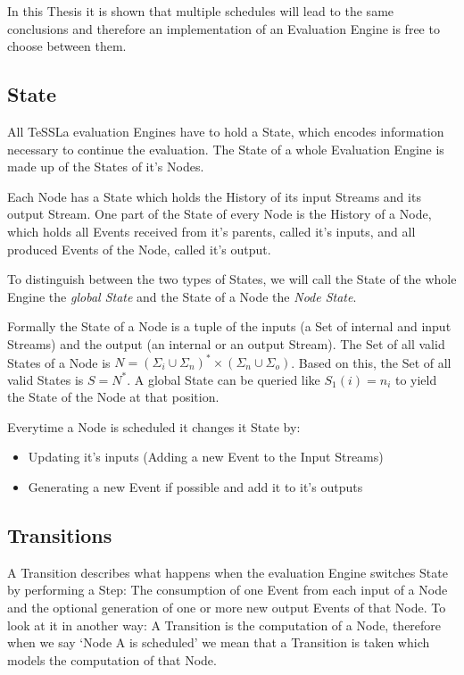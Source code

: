 In this Thesis it is shown that multiple schedules will lead to the same conclusions and therefore an implementation of an Evaluation Engine is free to choose between them.

\subsection{State}
\label{sec:concepts:def:state}

All TeSSLa evaluation Engines have to hold a State, which encodes information necessary to continue the evaluation.
The State of a whole Evaluation Engine is made up of the States of it's Nodes.

Each Node has a State which holds the History of its input Streams and its output Stream.
One part of the State of every Node is the History of a Node, which holds all Events received from it's parents, called it's inputs, and all produced Events of the Node, called it's output.

To distinguish between the two types of States, we will call the State of the whole Engine the \emph{global State} and the State of a Node the \emph{Node State}.

Formally the State of a Node is a tuple of the inputs (a Set of internal and input Streams) and the output (an internal or an output Stream).
The Set of all valid States of a Node is \(N = {(\Sigma_i \cup \Sigma_n)}^*\times(\Sigma_n \cup \Sigma_o)\).
Based on this, the Set of all valid States is \(S = N^*\).
A global State can be queried like \(S_1(i) = n_i\) to yield the State of the Node at that position.

Everytime a Node is scheduled it changes it State by:

\begin{itemize}
  \item Updating it's inputs (Adding a new Event to the Input Streams)
  \item Generating a new Event if possible and add it to it's outputs
\end{itemize}

\subsection{Transitions}
\label{sec:concepts:def:transitions}

A Transition describes what happens when the evaluation Engine switches State by performing a Step:
The consumption of one Event from each input of a Node and the optional generation of one or more new output Events of that Node.
To look at it in another way: A Transition is the computation of a Node, therefore when we say `Node A is scheduled' we mean that a Transition is taken which models the computation of that Node.

